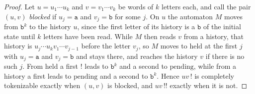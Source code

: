 \documentclass[11pt,a4paper]{article}
\theoremstyle{definition}
\theoremstyle{plain}
\newcommand{\code}[1]{\texttt{#1}}
\begin{document}
\begin{proof}
Let $u = u_1 \cdots u_k$ and $v = v_1 \cdots v_k$ be words of $k$ letters each, and call the pair $(u, v)$
\emph{blocked} if $u_j = \code{a}$ and $v_j = \code{b}$ for some $j$. On $u$ the automaton $M$ moves from $\code{b}^k$
to the history $u$, since the first letter of its history is a $\code{b}$ of the initial state until $k$ letters have
been read. While $M$ then reads $v$ from a history, that history is $u_j \cdots u_k v_1 \cdots v_{j-1}$ before the
letter $v_j$, so $M$ moves to $\mathrm{held}$ at the first $j$ with $u_j = \code{a}$ and $v_j = \code{b}$ and stays
there, and reaches the history $v$ if there is no such $j$. From $\mathrm{held}$ a first $\code{!}$ leads to
$\code{b}^k$ and a second to $\mathrm{pending}$, while from a history a first leads to $\mathrm{pending}$ and a second
to $\code{b}^k$. Hence $uv\,\code{!}$ is completely tokenizable exactly when $(u, v)$ is blocked, and $uv\,\code{!!}$
exactly when it is not.


\end{proof}
\end{document}
